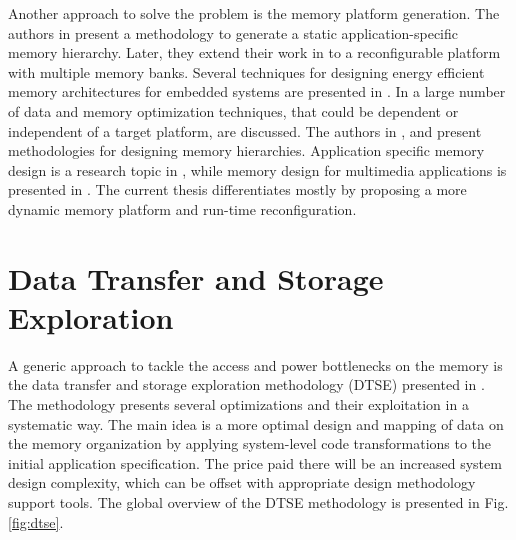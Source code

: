 Another approach to solve the problem is the memory platform generation.
The authors in \cite{Ben00b} present a methodology to generate a static application-specific memory hierarchy. 
Later, they extend their work in \cite{Ben00c} to a reconfigurable platform with multiple memory banks. 
Several techniques for designing energy efficient memory architectures for embedded systems are presented in \cite{Mac02}. 
In \cite{Pgk01} a large number of data and memory optimization techniques, that could be dependent or independent of a target platform, are discussed. 
The authors in \cite{abraham1999automatic}, \cite{jacob1996analytical} and \cite{li1999hardware} present methodologies for designing memory hierarchies.
Application specific memory design is a research topic in \cite{schmit1997synthesis}, while memory design for multimedia applications is presented in \cite{oshima1997high}.
The current thesis differentiates mostly by proposing a more dynamic memory platform and run-time reconfiguration. 

\section{Data Transfer and Storage Exploration}

A generic approach to tackle the access and power bottlenecks on the memory is the data transfer and storage exploration methodology (DTSE)  presented in \cite{dtse}.
The methodology presents several optimizations and their exploitation in a systematic way. 
The main idea is a more optimal design and mapping of data on the memory organization by applying system-level code transformations to the initial application specification. 
The price paid there will be an increased system design complexity, which can be offset with appropriate design methodology support tools. 
The global overview of the DTSE methodology is presented in Fig.\ref{fig:dtse}.

